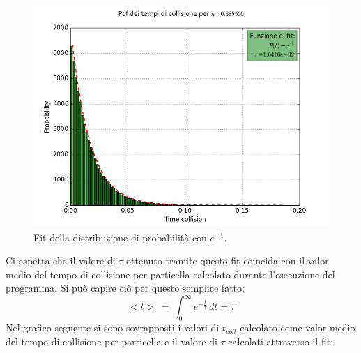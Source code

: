 \begin{center}
	\begin{figure}[h]
	\centering
		\includegraphics[scale=0.5]{sfere2D/fit_pdf_tc.png}
		\caption{Fit della distribuzione di probabilità con $e^{-\frac{t}{\tau}}$.}
	\end{figure}
\end{center}
Ci aspetta che il valore di $\tau$ ottenuto tramite questo fit coincida con il valor medio del tempo di collisione per particella calcolato durante l'esecuzione del programma. Si può capire ciò per questo semplice fatto:
$$
	<t> \, = \, \int_0^{\infty} e^{-\frac{t}{\tau}}\,dt = \tau
$$ 
Nel grafico seguente si sono sovrapposti i valori di $t_{coll}$ calcolato come valor medio del tempo di collisione per particella e il valore di $\tau$ calcolati attraverso il fit:
